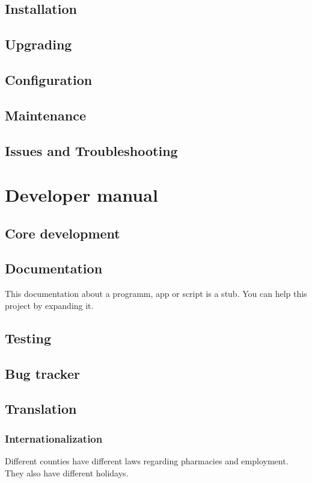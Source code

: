 \documentclass[12pt,a4paper,titlepage]{report}
\begin{document}
\section{Installation}\label{sec:installation}
\section{Upgrading}
\section{Configuration}
\section{Maintenance}
\section{Issues and Troubleshooting}


\chapter{Developer manual}
\section{Core development}
\section{Documentation}
This documentation about a programm, app or script is a stub. You can help this project by expanding it.

\section{Testing}
\section{Bug tracker}
\section{Translation}
\subsection{Internationalization}
Different counties have different laws regarding pharmacies and employment. They also have different holidays.
\end{document}
